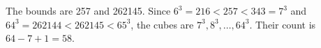 The bounds are 257 and 262145. Since $6^3=216<257<343=7^3$ and $64^3=262144<262145<65^3$, the cubes are $7^3,8^3,\ldots,64^3$. Their count is $64-7+1=\boxed{58}$.
